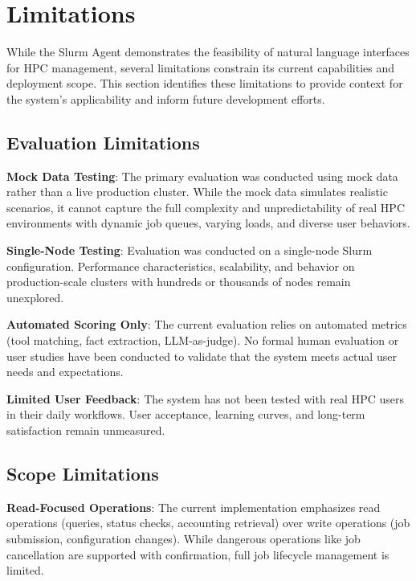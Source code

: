 \section{Limitations}
\label{sec:limitations}

While the Slurm Agent demonstrates the feasibility of natural language interfaces for HPC management, several limitations constrain its current capabilities and deployment scope. This section identifies these limitations to provide context for the system's applicability and inform future development efforts.

\subsection{Evaluation Limitations}

\textbf{Mock Data Testing}: The primary evaluation was conducted using mock data rather than a live production cluster. While the mock data simulates realistic scenarios, it cannot capture the full complexity and unpredictability of real HPC environments with dynamic job queues, varying loads, and diverse user behaviors.

\textbf{Single-Node Testing}: Evaluation was conducted on a single-node Slurm configuration. Performance characteristics, scalability, and behavior on production-scale clusters with hundreds or thousands of nodes remain unexplored.

\textbf{Automated Scoring Only}: The current evaluation relies on automated metrics (tool matching, fact extraction, LLM-as-judge). No formal human evaluation or user studies have been conducted to validate that the system meets actual user needs and expectations.

\textbf{Limited User Feedback}: The system has not been tested with real HPC users in their daily workflows. User acceptance, learning curves, and long-term satisfaction remain unmeasured.

\subsection{Scope Limitations}

\textbf{Read-Focused Operations}: The current implementation emphasizes read operations (queries, status checks, accounting retrieval) over write operations (job submission, configuration changes). While dangerous operations like job cancellation are supported with confirmation, full job lifecycle management is limited.

